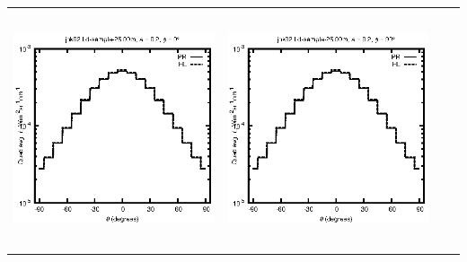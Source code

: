 \begin{tabular}{c c c c}
\includegraphics[height=7cm]{../eps/jok02_Ld_sample_25.00m_fwd.eps} &
\includegraphics[height=7cm]{../eps/jok02_Ld_sample_25.00m_cross.eps} \\
\end{tabular}

\pagebreak

